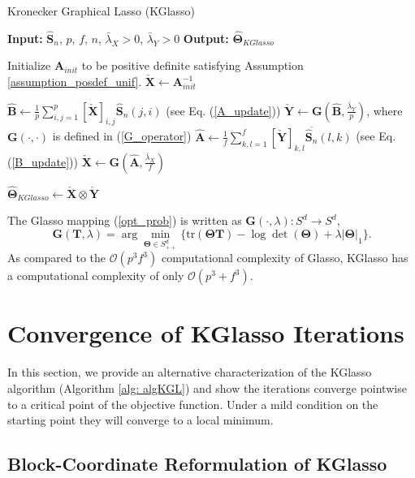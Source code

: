 \documentclass[journal,11pt,draftcls,onecolumn]{IEEEtran}
\def\tr{{\rm tr}}
\def\bA{ {\mathbf{A}} }
\def\bB{ {\mathbf{B}} }
\def\bG{ {\mathbf{G}} }
\def\bS{ {\mathbf{S}} }
\def\bT{ {\mathbf{T}} }
\def\bX{ {\mathbf{X}} }
\def\bY{ {\mathbf{Y}} }
\def\bTheta{ {\mathbf{\Theta}} }
\def\tr{{ \text{tr}   }}
\begin{document}
\begin{algorithm}
\caption{Kronecker Graphical Lasso (KGlasso) }
\label{alg: algKGL}
\begin{algorithmic}[1]
\STATE \textbf{Input:}  {$\hat{\bS}_n$, $p$, $f$, $n$, $\bar{\lambda}_X >0$, $\bar{\lambda}_Y >0$}
\STATE \textbf{Output:} {$\hat{\bTheta}_{KGlasso}$}

	\STATE Initialize $\bA_{init}$ to be positive definite satisfying Assumption \ref{assumption_posdef_unif}.
	\STATE $\check{\bX} \leftarrow \bA_{init}^{-1}$
	
	\REPEAT
	  \STATE	$\hat{\bB} \leftarrow \frac{1}{p} \sum_{i,j=1}^p{[\check{\bX}]_{i,j} \hat{\bS}_n(j,i)}$ (see Eq. (\ref{A_update}))
  	\STATE  $\check{\bY} \leftarrow \bG(\hat{\bB}, \frac{\bar{\lambda}_Y}{p})$, where $\bG(\cdot,\cdot)$ is defined in (\ref{G_operator})
  	\STATE  $\hat{\bA} \leftarrow \frac{1}{f} \sum_{k,l=1}^f{[\check{\bY}]_{k,l} \overline{\hat{\bS}_n}(l,k)}$ (see Eq. (\ref{B_update}))
  	\STATE  $\check{\bX} \leftarrow \bG(\hat{\bA}, \frac{\bar{\lambda}_X}{f})$
	
	\STATE $\hat{\bTheta}_{KGlasso} \leftarrow \check{\bX} \otimes \check{\bY}$
\end{algorithmic}
\end{algorithm}


The Glasso mapping (\ref{opt_prob}) is written as $\bG(\cdot,\lambda): S^d \to S^d$,
\begin{equation} \label{G_operator}
	\bG(\bT,\lambda) = \arg\min_{\bTheta \in S_{++}^d} \Big\{ \tr(\bTheta \bT)-\log\det(\bTheta)+\lambda|\bTheta|_1 \Big\}.
\end{equation}
As compared to the $\mathcal O(p^3f^3)$ computational complexity of Glasso, KGlasso has a computational complexity of only $\mathcal{O}(p^3+f^3)$.

\section{Convergence of KGlasso Iterations} \label{sec: convergence_analysis_KGL}
In this section, we provide an alternative characterization of the KGlasso algorithm (Algorithm \ref{alg: algKGL}) and show the iterations converge pointwise to a critical point of the objective function. Under a mild condition on the starting point they will converge to a local minimum.


\subsection{Block-Coordinate Reformulation of KGlasso}
\end{document}
